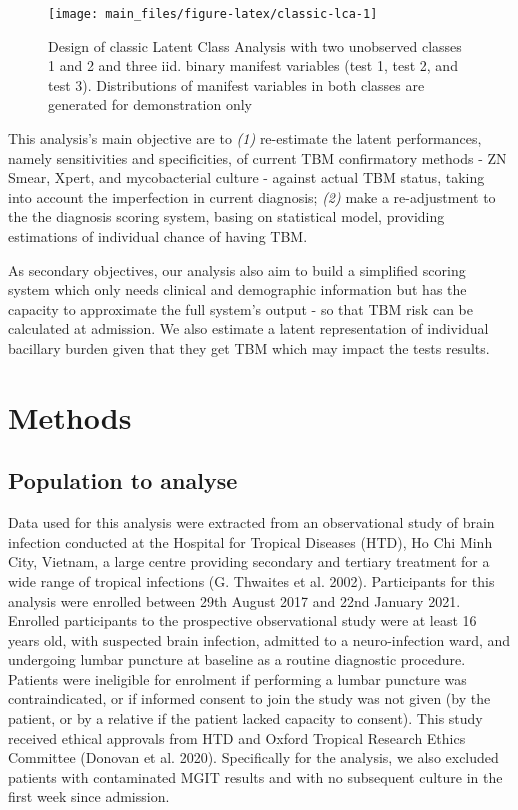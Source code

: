 \documentclass[
]{article}
\begin{document}
\begin{figure}

{\centering \texttt{[image: main\_files/figure-latex/classic-lca-1]} 

}

\caption{Design of classic Latent Class Analysis with two unobserved classes 1 and 2 and three iid. binary manifest variables (test 1, test 2, and test 3). Distributions of manifest variables in both classes are generated for demonstration only}\label{fig:classic-lca}
\end{figure}

This analysis's main objective are to \emph{(1)} re-estimate the latent performances, namely sensitivities and specificities, of current TBM confirmatory methods - ZN Smear, Xpert, and mycobacterial culture - against actual TBM status, taking into account the imperfection in current diagnosis; \emph{(2)} make a re-adjustment to the the diagnosis scoring system, basing on statistical model, providing estimations of individual chance of having TBM.

As secondary objectives, our analysis also aim to build a simplified scoring system which only needs clinical and demographic information but has the capacity to approximate the full system's output - so that TBM risk can be calculated at admission. We also estimate a latent representation of individual bacillary burden given that they get TBM which may impact the tests results.

\hypertarget{methods}{%
\section{Methods}\label{methods}}

\hypertarget{population-to-analyse}{%
\subsection{Population to analyse}\label{population-to-analyse}}

Data used for this analysis were extracted from an observational study of brain infection conducted at the Hospital for Tropical Diseases (HTD), Ho Chi Minh City, Vietnam, a large centre providing secondary and tertiary treatment for a wide range of tropical infections (G. Thwaites et al. 2002). Participants for this analysis were enrolled between 29th August 2017 and 22nd January 2021. Enrolled participants to the prospective observational study were at least 16 years old, with suspected brain infection, admitted to a neuro-infection ward, and undergoing lumbar puncture at baseline as a routine diagnostic procedure. Patients were ineligible for enrolment if performing a lumbar puncture was contraindicated, or if informed consent to join the study was not given (by the patient, or by a relative if the patient lacked capacity to consent). This study received ethical approvals from HTD and Oxford Tropical Research Ethics Committee (Donovan et al. 2020). Specifically for the analysis, we also excluded patients with contaminated MGIT results and with no subsequent culture in the first week since admission.
\end{document}
